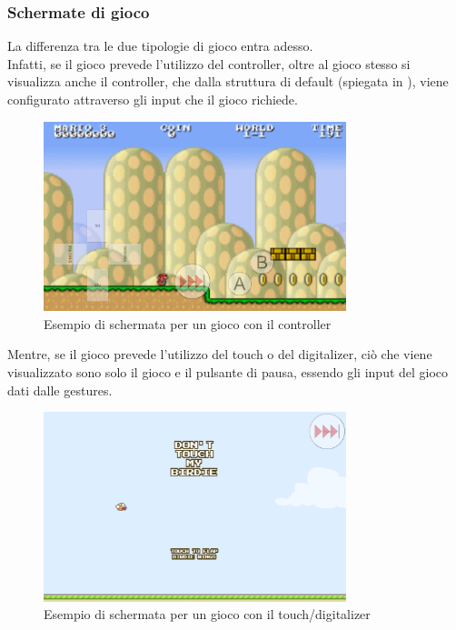 \subsubsection{Schermate di gioco}
La differenza tra le due tipologie di gioco entra adesso.\\
Infatti, se il gioco prevede l'utilizzo del controller, oltre al gioco stesso si visualizza anche il controller, che dalla struttura di default (spiegata in ), viene configurato attraverso gli input che il gioco richiede.
\begin{figure}[h]
    \centering
    \includegraphics[width=250pt]{images/product/schermataGiocoController.png}
    \caption{Esempio di schermata per un gioco con il controller}
    \label{fig:schermataGiocoController}
\end{figure}
\newpage
Mentre, se il gioco prevede l'utilizzo del touch o del digitalizer, ciò che viene visualizzato sono solo il gioco e il pulsante di pausa, essendo gli input del gioco dati dalle gestures.\\
\begin{figure}[h]
    \centering
    \includegraphics[width=250pt]{images/product/schermataGiocoTouchDigit.png}
    \caption{Esempio di schermata per un gioco con il touch/digitalizer}
    \label{fig:schermataGiocoTouchDigit}
\end{figure}
